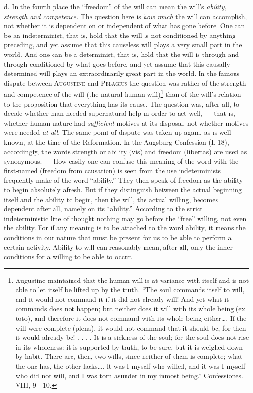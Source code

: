 \documentclass[12pt,a4paper,openany]{book}
\newcommand{\opage}[1]{\marginnote{\footnotesize\textit{[#1]}}}
\begin{document}
d. In the fourth place the ``freedom'' of the will can mean the will's \textit{ability, strength and
competence.} The question here is \textit{how much} the will can accomplish, not whether it is dependent
on or independent of what has gone before. One can be an indeterminist, that is, hold that the will is
not conditioned by anything preceding, and yet assume that this causeless will plays
\opage{109}a very small part in the world. And one can be a determinist, that is, hold that the will is through
and through conditioned by what goes before, and yet assume that this causally determined will plays an
extraordinarily great part in the world. In the famous dispute between \textsc{Augustine} and
\textsc{Pelagius} the question was rather of the strength and competence of the will (the natural human
will)\footnote[1]{Augustine maintained that the human will is at variance with itself and is not able
to let itself be lifted up by the truth. ``The soul commands itself to will, and it would not command it
if it did not already will! And yet what it commands does not happen; but neither does it will with its
whole being (ex toto), and therefore it does not command with its whole being either\dots{}. If the will
were complete (plena), it would not command that it should be, for then it would already be! . . . . It
is a sickness of the soul; for the soul does not rise in its wholeness: it is supported by truth, to be
sure, but it is weighed down by habit. There are, then, two wills, since neither of them is complete;
what the one has, the other lacks\dots{}. It was I myself who willed, and it was I myself who did not
will, and I was torn asunder in my inmost being.'' Confessiones. VIII, 9---10.} than of the will's
relation to the proposition that everything has its cause. The question was, after all, to decide
whether man needed supernatural help in order to act well, --- that is, whether human nature had
\textit{sufficient} motives at its disposal, not whether motives were needed \textit{at all}. The same
point of dispute was taken up again, as is well known, at the time of the Reformation. In the Augsburg
Confession (I, 18), accordingly, the words strength or ability (vis) and freedom (libertas) are used as
synonymous. --- How easily one can confuse this meaning of the word with the first-named (freedom from
causation) is seen from the use indeterminists frequently make of the word ``ability.'' They then speak
of freedom as the ability to begin absolutely afresh. But if they distinguish between the actual
beginning itself and the ability to begin, then the will, the actual willing, becomes dependent after
all, namely on its ``ability.'' According to the strict indeterministic line of thought nothing may go
before the ``free'' willing, not even the ability. For if any meaning is to be attached to the word
ability, it means the conditions in our nature that must be present for us to be able to perform a
certain activity. Ability to will can
\opage{110}reasonably mean, after all, only the inner conditions for a willing to be able to occur.
\end{document}
